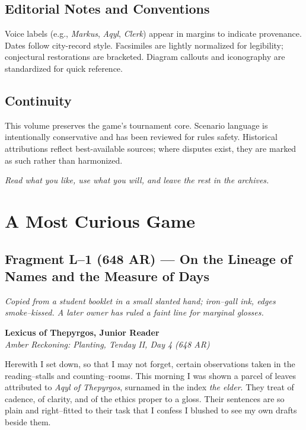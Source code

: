 \documentclass[11pt]{article}
\numberwithin{equation}{section} %
\theoremstyle{plain} %
\theoremstyle{definition} %
\theoremstyle{remark} %
\begin{document}
\subsection{Editorial Notes and Conventions}
Voice labels (e.g., \emph{Markus}, \emph{Aqyl}, \emph{Clerk}) appear in margins to indicate provenance. Dates follow city-record style. Facsimiles are lightly normalized for legibility; conjectural restorations are bracketed. Diagram callouts and iconography are standardized for quick reference.

\subsection{Continuity}
This volume preserves the game’s tournament core. Scenario language is intentionally conservative and has been reviewed for rules safety. Historical attributions reflect best-available sources; where disputes exist, they are marked as such rather than harmonized.

\medskip
\noindent\textit{Read what you like, use what you will, and leave the rest in the archives.}

\clearpage
{}

\section{A Most Curious Game}
\label{sec:curious-game}

\subsection{Fragment L--1 (648 AR) — On the Lineage of Names and the Measure of Days}
\label{frag:l1}

\noindent\textit{Copied from a student booklet in a small slanted hand; iron–gall ink, edges smoke–kissed. A later owner has ruled a faint line for marginal glosses.}

\medskip
\noindent\textbf{Lexicus of Thepyrgos, Junior Reader}\\
\textit{Amber Reckoning: Planting, Tenday II, Day 4 (648 AR)}

Herewith I set down, so that I may not forget, certain observations taken in the reading–stalls and counting–rooms. This morning I was shown a parcel of leaves attributed to \textit{Aqyl of Thepyrgos}, surnamed in the index \textit{the elder}. They treat of cadence, of clarity, and of the ethics proper to a gloss. Their sentences are so plain and right–fitted to their task that I confess I blushed to see my own drafts beside them.
\end{document}
